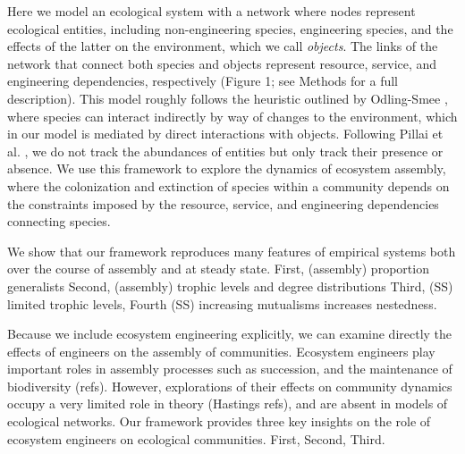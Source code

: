 \documentclass[9pt,twocolumn,twoside]{pnas-new}
\begin{document}
Here we model an ecological system with a network where nodes represent ecological entities, including non-engineering species, engineering species, and the effects of the latter on the environment, which we call \emph{objects}.
The links of the network that connect both species and objects represent resource, service, and engineering dependencies, respectively (Figure 1; see Methods for a full description).
This model roughly follows the heuristic outlined by Odling-Smee \cite{OdlingSmee2013}, where species can interact indirectly by way of changes to the environment, which in our model is mediated by direct interactions with objects.
Following Pillai et al. \cite{Pillai2011}, we do not track the abundances of entities but only track their presence or absence.
We use this framework to explore the dynamics of ecosystem assembly, where the colonization and extinction of species within a community depends on the constraints imposed by the resource, service, and engineering dependencies connecting species.


We show that our framework reproduces many features of empirical systems both over the course of assembly and at steady state.
First, (assembly) proportion generalists
Second, (assembly) trophic levels and degree distributions
Third, (SS) limited trophic levels,
Fourth (SS) increasing mutualisms increases nestedness.

Because we include ecosystem engineering explicitly, we can examine directly the effects of engineers on the assembly of communities.
Ecosystem engineers play important roles in assembly processes such as succession, and the maintenance of biodiversity (refs).
However, explorations of their effects on community dynamics occupy a very limited role in theory (Hastings refs), and are absent in models of ecological networks.
Our framework provides three key insights on the role of ecosystem engineers on ecological communities.
First,
Second,
Third.\\
\end{document}

